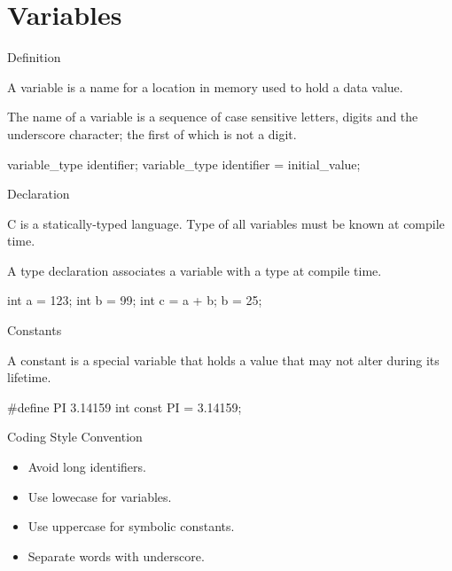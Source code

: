 \documentclass[compress]{beamer}
\begin{document}
\prepareCover

\section{Variables}

\begin{slide}
	\begin{block}{Definition}

	A variable is a name for a location in memory used to hold a data value.

	The name of a variable is a sequence of case sensitive letters, digits and the underscore character; the first of which is not a digit.

	\begin{terminal}
	variable_type identifier;
	variable_type identifier = initial_value;
	\end{terminal}

	\end{block}
\end{slide}

\begin{slide}
	\begin{block}{Declaration}

	C is a statically-typed language.
	Type of all variables must be known at compile time.

	A type declaration associates a variable with a type at compile time.

	\begin{terminal}
	int a = 123;
	int b = 99;
	int c = a + b;
	b = 25;
	\end{terminal}

	\end{block}
\end{slide}

\begin{slide}
	\begin{block}{Constants}

	A constant is a special variable that holds a value that may not alter during its lifetime.

	\begin{terminal}
	#define PI 3.14159
	int const PI = 3.14159;
	\end{terminal}

	\end{block}
\end{slide}

\begin{slide}
	\begin{block}{Coding Style Convention}

	\begin{itemize}
	\item[] Avoid long identifiers.
	\item[] Use lowecase for variables.
	\item[] Use uppercase for symbolic constants.
	\item[] Separate words with underscore.
	\end{itemize}

	\end{block}
\end{slide}
\end{document}
